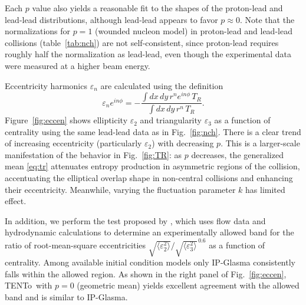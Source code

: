 \documentclass[aps,prc,reprint,amsmath]{revtex4-1}
\newcommand{\trento}{T\raisebox{-.5ex}{R}ENTo}
\newcommand{\eccratio}{\sqrt{\langle \varepsilon_2^2 \rangle}/\sqrt{\langle \varepsilon_3^2 \rangle}^{\,0.6}}
\begin{document}
Each $p$ value also yields a reasonable fit to the shapes of the proton-lead and lead-lead distributions, although lead-lead appears to favor $p \approx 0$.
Note that the normalizations for $p = 1$ (wounded nucleon model) in proton-lead and lead-lead collisions (table~\ref{tab:nch}) are not self-consistent, since proton-lead requires roughly half the normalization as lead-lead, even though the experimental data were measured at a higher beam energy.

Eccentricity harmonics $\varepsilon_n$ are calculated using the definition
\begin{equation}
  \varepsilon_n e^{i n\phi} = -\frac{\int dx \, dy\, r^n e^{i n \phi} \, T_R}{\int dx \, dy \, r^n \, T_R}.
\end{equation}
Figure~\ref{fig:eccen} shows ellipticity $\varepsilon_2$ and triangularity $\varepsilon_3$ as a function of centrality using the same lead-lead data as in Fig.~\ref{fig:nch}.
There is a clear trend of increasing eccentricity (particularly $\varepsilon_2$) with decreasing $p$.
This is a larger-scale manifestation of the behavior in Fig.~\ref{fig:TR}:
as $p$ decreases, the generalized mean \eqref{eq:tr} attenuates entropy production in asymmetric regions of the collision, accentuating the elliptical overlap shape in non-central collisions and enhancing their eccentricity.
Meanwhile, varying the fluctuation parameter $k$ has limited effect.

In addition, we perform the test proposed by \cite{Retinskaya:2013gca}, which uses flow data and hydrodynamic calculations to determine an experimentally allowed band for the ratio of root-mean-square eccentricities $\eccratio$ as a function of centrality.
Among available initial condition models only IP-Glasma consistently falls within the allowed region.
As shown in the right panel of Fig.~\ref{fig:eccen}, \trento\ with $p = 0$ (geometric mean) yields excellent agreement with the allowed band and is similar to IP-Glasma.
\end{document}
